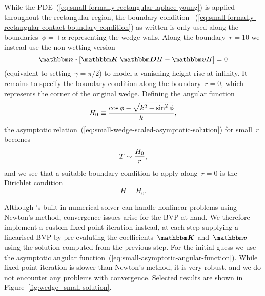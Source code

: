 While the PDE~(\ref{eq:small-formally-rectangular-laplace-young})
is applied throughout the rectangular region,
the boundary condition~%
  (\ref{eq:small-formally-rectangular-contact-boundary-condition})
as written
is only used along the boundaries~$\phi = \pm\alpha$
representing the wedge walls.
Along the boundary~$r = 10$ we instead use the non-wetting version
\begin{equation}
  \mat{n} \dotp \squarebr[\bulkysize]{\mat{K} \matder H - \mat{v} H} = 0
  \label{eq:small-formally-rectangular-natural-boundary-condition}
\end{equation}
(equivalent to setting~$\gamma = \pi/2$)
to model a vanishing height rise at infinity.
It remains to specify the boundary condition along the boundary~$r = 0$,
which represents the corner of the original wedge.
Defining the angular function
\begin{equation}
  H_0 \equiv \frac{\cos\phi - \sqrt{k^2 - \sin^2 \phi}}{k},
  \label{eq:small-asymptotic-angular-function}
\end{equation}
the asymptotic relation~(\ref{eq:small-wedge-scaled-asymptotic-solution})
for small~$r$ becomes
\begin{equation}
  T \sim \frac{H_0}{r},
  \label{eq:small-asymptotic-solution}
\end{equation}
and we see that a suitable boundary condition to apply along~$r = 0$
is the Dirichlet condition
\begin{equation}
  H = H_0.
  \label{eq:small-formally-rectangular-dirichlet-condition}
\end{equation}

Although 's built-in numerical solver
can handle nonlinear problems using Newton's method,
convergence issues arise for the BVP at hand.
We therefore implement a custom fixed-point iteration instead,
at each step supplying a linearised BVP
by pre-evaluting the coefficients~$\mat{K}$ and~$\mat{v}$
using the solution computed from the previous step.
For the initial guess we use
the asymptotic angular function~(\ref{eq:small-asymptotic-angular-function}).
While fixed-point iteration is slower than Newton's method,
it is very robust, and we do not encounter any problems with convergence.
Selected results are shown in Figure~\ref{fig:wedge_small-solution}.


